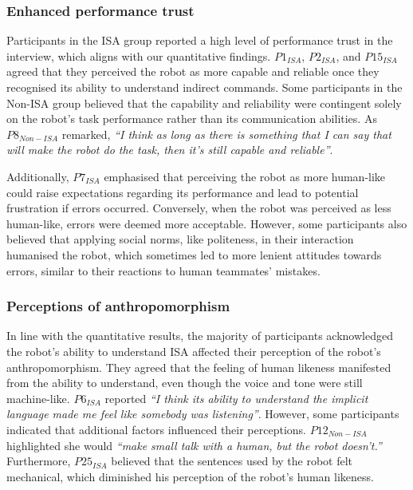 \subsubsection{Enhanced performance trust}
Participants in the ISA group reported a high level of performance trust in the interview, which aligns with our quantitative findings. $P1_{ISA}$, $P2_{ISA}$, and $P15_{ISA}$ agreed that they perceived the robot as more capable and reliable once they recognised its ability to understand indirect commands. Some participants in the Non-ISA group believed that the capability and reliability were contingent solely on the robot's task performance rather than its communication abilities. As $P8_{Non-ISA}$ remarked, \textit{``I think as long as there is something that I can say that will make the robot do the task, then it's still capable and reliable''}. 

Additionally, $P7_{ISA}$ emphasised that perceiving the robot as more human-like could raise expectations regarding its performance and lead to potential frustration if errors occurred. Conversely, when the robot was perceived as less human-like, errors were deemed more acceptable. However, some participants also believed that applying social norms, like politeness, in their interaction humanised the robot, which sometimes led to more lenient attitudes towards errors, similar to their reactions to human teammates' mistakes. 

\subsubsection{Perceptions of anthropomorphism}
In line with the quantitative results, the majority of participants acknowledged the robot's ability to understand ISA affected their perception of the robot's anthropomorphism. They agreed that the feeling of human likeness manifested from the ability to understand, even though the voice and tone were still machine-like. $P6_{ISA}$ reported \textit{``I think its ability to understand the implicit language made me feel like somebody was listening''}. However, some participants indicated that additional factors influenced their perceptions. $P12_{Non-ISA}$ highlighted she would \textit{``make small talk with a human, but the robot doesn't.''} Furthermore, $P25_{ISA}$ believed that the sentences used by the robot felt mechanical, which diminished his perception of the robot's human likeness.

